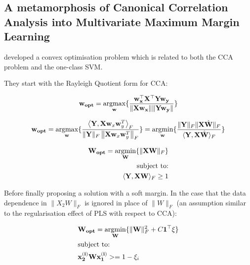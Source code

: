 \subsection{A metamorphosis of Canonical Correlation Analysis into Multivariate Maximum Margin Learning}

\cite{szedmak2007metamorphosis} developed a convex optimisation problem which is related to both the CCA problem and the one-class SVM. 

They start with the Rayleigh Quotient form for CCA:

\begin{align}
    & \bold{w_{opt}}=\underset{\bold{w}}{\mathrm{argmax}}\{\frac{ \bold{w_x^{\top}X^{\top}Yw_y } }{\|\bold{Xw_x}\|\|\bold{Yw_y}\|}\}\\
\end{align}

\begin{align}
    \bold{w_{opt}}=\underset{\bold{w}}{\mathrm{argmax}}\{\frac{\left\langle\mathbf{Y}, \mathbf{X} \mathbf{w}_{x} \mathbf{w}_{y}^{T}\right\rangle_{F}}{\|\mathbf{Y}\|_{F}\left\|\mathbf{X} \mathbf{w}_{x} \mathbf{w}_{y}^{T}\right\|_{F}}\}=\underset{\bold{w}}{\mathrm{argmin}}\{\frac{\|\mathbf{Y}\|_{F}\|\mathbf{X} \hat{\mathbf{W}}\|_{F}}{\langle\mathbf{Y}, \mathbf{X} \hat{\mathbf{W}}\rangle_{F}}\}\\
\end{align}

\begin{align}
    \bold{W_{opt}}=\underset{\bold{W}}{\mathrm{argmin}}\{ \|\mathbf{X}\mathbf{W}\|_{F}\} \\
    \text{subject to:} \notag\\ 
    \langle\mathbf{Y}, \mathbf{X} \mathbf{W}\rangle_{F} \geq 1
\end{align}


Before finally proposing a solution with a soft margin. In the case that the data dependence in $\|X_2W\|_F$ is ignored in place of $\|W\|_F$ (an assumption similar to the regularisation effect of PLS with respect to CCA):

\begin{align}
    & \bold{W_{opt}}=\underset{\bold{W}}{\mathrm{argmin}}\{\|\bold{W}\|^2_F + C\bold{1}^{\top}\xi\}\\
    & \text{subject to:} \notag\\
    & \bold{x^{(i)}_2 W x^{(i)}_1}  >=1-\xi_i \notag\\
\end{align}

